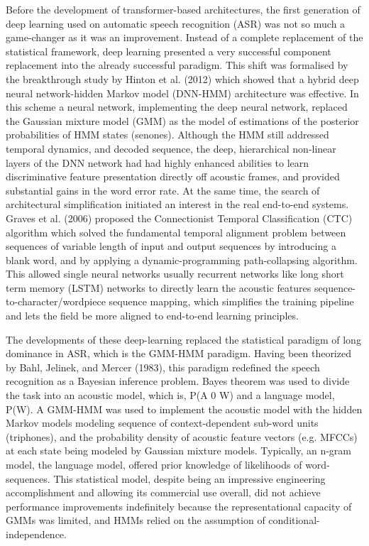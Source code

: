 Before the development of transformer-based architectures, the first generation of deep learning used on automatic speech recognition (ASR) was not so much a game-changer as it was an improvement. Instead of a complete replacement of the statistical framework, deep learning presented a very successful component replacement into the already successful paradigm. This shift was formalised by the breakthrough study by Hinton et al. (2012) which showed that a hybrid deep neural network-hidden Markov model (DNN-HMM) architecture was effective. In this scheme a neural network, implementing the deep neural network, replaced the Gaussian mixture model (GMM) as the model of estimations of the posterior probabilities of HMM states (senones). Although the HMM still addressed temporal dynamics, and decoded sequence, the deep, hierarchical non-linear layers of the DNN network had had highly enhanced abilities to learn discriminative feature presentation directly off acoustic frames, and provided substantial gains in the word error rate. At the same time, the search of architectural simplification initiated an interest in the real end-to-end systems. Graves et al. (2006) proposed the Connectionist Temporal Classification (CTC) \cite{ctc-graves} algorithm which solved the fundamental temporal alignment problem between sequences of variable length of input and output sequences by introducing a blank word, and by applying a dynamic-programming path-collapsing algorithm. This allowed single neural networks usually recurrent networks like long short term memory (LSTM) networks to directly learn the acoustic features sequence-to-character/wordpiece sequence mapping, which simplifies the training pipeline and lets the field be more aligned to end-to-end learning principles.

The developments of these deep-learning replaced the statistical paradigm of long dominance in ASR, which is the GMM-HMM paradigm. Having been theorized by Bahl, Jelinek, and Mercer (1983)\cite{bahl}, this paradigm redefined the speech recognition as a Bayesian inference problem. Bayes theorem was used to divide the task into an acoustic model, which is, P(A 0 W) and a language model, P(W). A GMM-HMM was used to implement the acoustic model with the hidden Markov models modeling sequence of context-dependent sub-word units (triphones), and the probability density of acoustic feature vectors (e.g. MFCCs) at each state being modeled by Gaussian mixture models. Typically, an n-gram model, the language model, offered prior knowledge of likelihoods of word-sequences. This statistical model, despite being an impressive engineering accomplishment and allowing its commercial use overall, did not achieve performance improvements indefinitely because the representational capacity of GMMs was limited, and HMMs relied on the assumption of conditional-independence.

